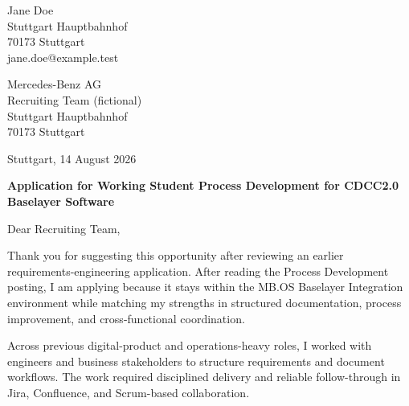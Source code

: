 \documentclass[9pt,a4paper]{article}
\begin{document}
\begin{flushright}
\begin{minipage}[t]{0.34\textwidth}
\raggedleft
Jane Doe\\
Stuttgart Hauptbahnhof\\
70173 Stuttgart\\
jane.doe@example.test
\end{minipage}
\end{flushright}

\vspace{1.4em}

\noindent
\begin{minipage}[t]{0.42\textwidth}
Mercedes-Benz AG\\
Recruiting Team (fictional)\\
Stuttgart Hauptbahnhof\\
70173 Stuttgart
\end{minipage}

\vspace{0.5em}

\begin{flushright}
Stuttgart, 14 August 2026
\end{flushright}

\vspace{0.3em}

\textbf{Application for Working Student Process Development for CDCC2.0 Baselayer Software}

\vspace{0.6em}

Dear Recruiting Team,

\vspace{0.45em}

Thank you for suggesting this opportunity after reviewing an earlier requirements-engineering application. After reading the Process Development posting, I am applying because it stays within the MB.OS Baselayer Integration environment while matching my strengths in structured documentation, process improvement, and cross-functional coordination.

\vspace{0.45em}

Across previous digital-product and operations-heavy roles, I worked with engineers and business stakeholders to structure requirements and document workflows. The work required disciplined delivery and reliable follow-through in Jira, Confluence, and Scrum-based collaboration.

\vspace{0.45em}
\end{document}
